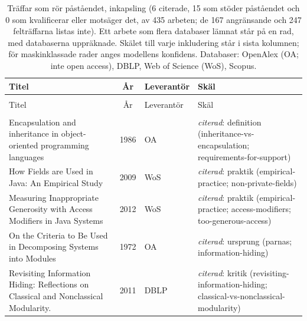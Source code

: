 
\begingroup\footnotesize
\begin{longtable}{@{}%
  >{\raggedright\arraybackslash}p{}c%
  >{\raggedright\arraybackslash}p{}%
  >{\raggedright\arraybackslash}p{}@{}}
\caption{Träffar som rör påståendet, inkapsling (6 citerade, 15 som stöder påståendet och 0 som kvalificerar eller motsäger det, av 435 arbeten; de 167 angränsande och 247 felträffarna listas inte).  Ett arbete som flera databaser lämnat står på en rad, med databaserna uppräknade. Skälet till varje inkludering står i sista kolumnen; för maskinklassade rader anges modellens konfidens. Databaser: OpenAlex (OA; inte open access), DBLP, Web of Science (WoS), Scopus.}\label{tab:sok-inkapsling}\\
\toprule
Titel & År & Leverantör & Skäl \\
\midrule
\endfirsthead
\multicolumn{4}{@{}l}{\emph{\tablename~\thetable{} (\GetTranslation{continued})}}\\
\toprule
Titel & År & Leverantör & Skäl \\
\midrule
\endhead
\midrule \multicolumn{4}{r@{}}{\emph{\GetTranslation{continued on the next page}}}\\
\endfoot
\bottomrule
\endlastfoot
Encapsulation and inheritance in object-oriented programming languages & 1986 & OA & \emph{citerad}: definition (inheritance-vs-encapsulation; requirements-for-support) \\
How Fields are Used in Java: An Empirical Study & 2009 & WoS & \emph{citerad}: praktik (empirical-practice; non-private-fields) \\
Measuring Inappropriate Generosity with Access Modifiers in Java Systems & 2012 & WoS & \emph{citerad}: praktik (empirical-practice; access-modifiers; too-generous-access) \\
On the Criteria to Be Used in Decomposing Systems into Modules & 1972 & OA & \emph{citerad}: ursprung (parnas; information-hiding) \\
Revisiting Information Hiding: Reflections on Classical and Nonclassical Modularity. & 2011 & DBLP & \emph{citerad}: kritik (revisiting-information-hiding; classical-vs-nonclassical-modularity) \\

\end{longtable}
